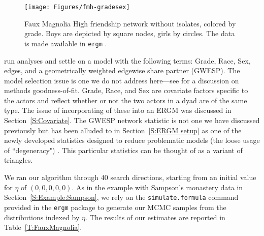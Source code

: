 \begin{figure}[!ht]
\centering
\texttt{[image: Figures/fmh-gradesex]}
\caption[Faux Magnolia High friendship network without isolates, colored by grade]
{Faux Magnolia High friendship network without isolates, colored by grade.  Boys
are depicted by square nodes, girls by circles.  The data is made available in \texttt{ergm} \citep{ergm:R}.}
\label{F:fmh}
\end{figure}

\citet{statnet-tutorial} run analyses and settle on a model with the following terms: 
Grade, Race, Sex, edges, and a geometrically weighted edgewise share partner (GWESP). The model selection issue is one we do not address here---see \citep{GOF}
 for a discussion on methods goodness-of-fit.  
Grade, Race, and Sex are covariate factors specific to the 
actors and reflect whether or not the two actors in a dyad are of the same type.  
The issue of incorporating of these into an ERGM was 
discussed in Section~\ref{S:Covariate}.  The GWESP network statistic is not one we
have discussed previously but has been alluded to in Section~\ref{S:ERGM setup} as
one of the newly developed statistics designed to reduce problematic models
(the loose usage of ``degeneracy") 
\citep{Handcock:2006, Hunter:2006, recentp*}.  This particular statistics can be 
thought of as a variant of triangles.

We ran our algorithm through 40 search directions, starting from an initial value for 
$\eta$ of $(0, 0, 0, 0, 0)$.  As in the example with Sampson's monastery data
in Section~\ref{S:Example:Sampson}, we rely
on the \texttt{simulate.formula} command provided in the \texttt{ergm} package to
generate our MCMC samples from the distributions indexed by $\eta$.  The results of our 
estimates are reported in Table~\ref{T:FauxMagnolia}.
%
%
%

